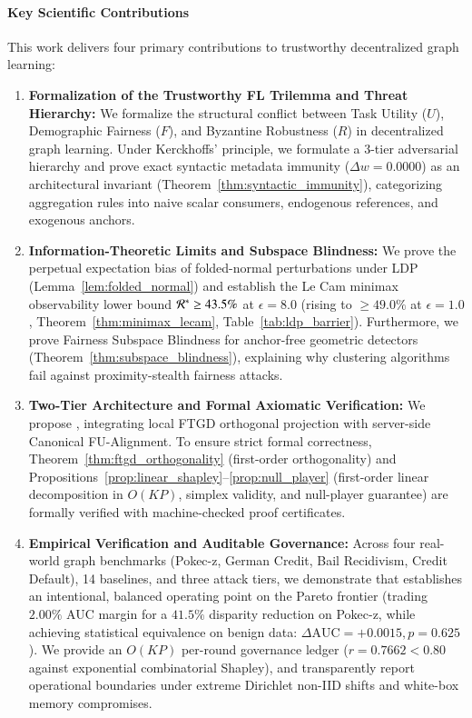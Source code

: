 \paragraph{Key Scientific Contributions}
This work delivers four primary contributions to trustworthy decentralized graph learning:
\begin{enumerate}[leftmargin=*]
    \item \textbf{Formalization of the Trustworthy FL Trilemma and Threat Hierarchy:} We formalize the structural conflict between Task Utility ($U$), Demographic Fairness ($F$), and Byzantine Robustness ($R$) in decentralized graph learning. Under Kerckhoffs' principle, we formulate a 3-tier adversarial hierarchy and prove exact syntactic metadata immunity ($\Delta w = 0.0000$) as an architectural invariant (Theorem~\ref{thm:syntactic_immunity}), categorizing aggregation rules into naive scalar consumers, endogenous references, and exogenous anchors.
    \item \textbf{Information-Theoretic Limits and Subspace Blindness:} We prove the perpetual expectation bias of folded-normal perturbations under LDP (Lemma~\ref{lem:folded_normal}) and establish the Le Cam minimax observability lower bound $\mathcal{R}^* \ge 43.5\%$ at $\epsilon = 8.0$ (rising to $\ge 49.0\%$ at $\epsilon = 1.0$, Theorem~\ref{thm:minimax_lecam}, Table~\ref{tab:ldp_barrier}). Furthermore, we prove Fairness Subspace Blindness for anchor-free geometric detectors (Theorem~\ref{thm:subspace_blindness}), explaining why clustering algorithms fail against proximity-stealth fairness attacks.
    \item \textbf{Two-Tier Architecture and Formal Axiomatic Verification:} We propose \MethodName{}, integrating local FTGD orthogonal projection with server-side Canonical FU-Alignment. To ensure strict formal correctness, Theorem~\ref{thm:ftgd_orthogonality} (first-order orthogonality) and Propositions~\ref{prop:linear_shapley}--\ref{prop:null_player} (first-order linear decomposition in $O(KP)$, simplex validity, and null-player guarantee) are formally verified with machine-checked proof certificates.
    \item \textbf{Empirical Verification and Auditable Governance:} Across four real-world graph benchmarks (Pokec-z, German Credit, Bail Recidivism, Credit Default), 14 baselines, and three attack tiers, we demonstrate that \MethodName{} establishes an intentional, balanced operating point on the Pareto frontier (trading $2.00\%$ AUC margin for a $41.5\%$ disparity reduction on Pokec-z, while achieving statistical equivalence on benign data: $\Delta\mathrm{AUC} = +0.0015, p = 0.625$). We provide an $O(KP)$ per-round governance ledger ($r = 0.7662 < 0.80$ against exponential combinatorial Shapley), and transparently report operational boundaries under extreme Dirichlet non-IID shifts and white-box memory compromises.
\end{enumerate}

